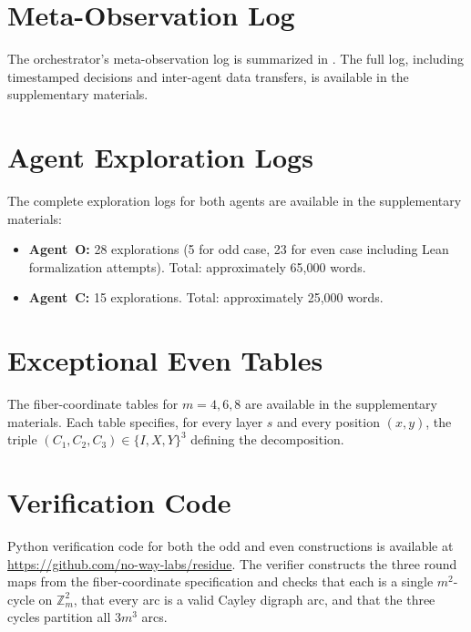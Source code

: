 \documentclass[11pt]{article}
\theoremstyle{definition}
\theoremstyle{remark}
\newcommand{\Zm}{\mathbb{Z}_m}
\begin{document}
\section{Meta-Observation Log}
\label{app:meta}

The orchestrator's meta-observation log is summarized in . The full log, including timestamped decisions and inter-agent data transfers, is available in the supplementary materials.

\section{Agent Exploration Logs}
\label{app:logs}

The complete exploration logs for both agents are available in the supplementary materials:
\begin{itemize}
    \item \textbf{Agent~O:} 28 explorations (5 for odd case, 23 for even case including Lean formalization attempts). Total: approximately 65{,}000 words.
    \item \textbf{Agent~C:} 15 explorations. Total: approximately 25{,}000 words.
\end{itemize}

\section{Exceptional Even Tables}
\label{app:tables}

The fiber-coordinate tables for $m = 4, 6, 8$ are available in the supplementary materials. Each table specifies, for every layer $s$ and every position $(x, y)$, the triple $(C_1, C_2, C_3) \in \{I, X, Y\}^3$ defining the decomposition.

\section{Verification Code}
\label{app:code}

Python verification code for both the odd and even constructions is available at \url{https://github.com/no-way-labs/residue}. The verifier constructs the three round maps from the fiber-coordinate specification and checks that each is a single $m^2$-cycle on $\Zm^2$, that every arc is a valid Cayley digraph arc, and that the three cycles partition all $3m^3$ arcs.
\end{document}
